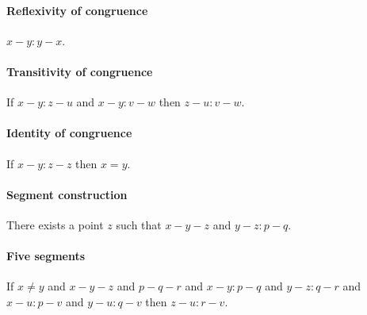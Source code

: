 \documentclass{article}
\begin{document}
  \paragraph{Reflexivity of congruence}

  \begin{forthel}
    \begin{axiom}[A1]
      $x-y : y-x$.
    \end{axiom}
  \end{forthel}


  \paragraph{Transitivity of congruence}

  \begin{forthel}
    \begin{axiom}[A2]
      If $x-y : z-u$ and $x-y : v-w$ then $z-u : v-w$.
    \end{axiom}
  \end{forthel}


  \paragraph{Identity of congruence}

  \begin{forthel}
    \begin{axiom}[A3]
      If $x-y : z-z$ then $x = y$.
    \end{axiom}
  \end{forthel}


  \paragraph{Segment construction}

  \begin{forthel}
    \begin{axiom}[A4]
      There exists a point $z$ such that $x-y-z$ and $y-z : p-q$.
    \end{axiom}
  \end{forthel}


  \paragraph{Five segments}

  \begin{forthel}
    \begin{axiom}[A5]
      If $x \neq y$ and $x-y-z$ and $p-q-r$ and $x-y : p-q$ and $y-z : q-r$ and $x-u : p-v$ and $y-u : q-v$ then $z-u : r-v$.
    \end{axiom}
  \end{forthel}
\end{document}
